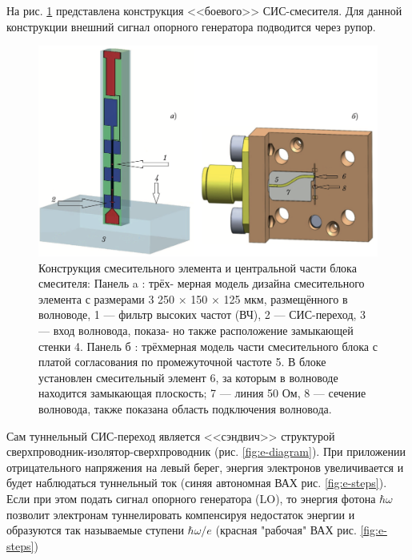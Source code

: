 \documentclass[a4paper]{article}
\begin{document}
На рис. \ref{fig:mixer} представлена конструкция <<боевого>> СИС-смесителя. Для данной конструкции внешний сигнал опорного генератора подводится через рупор.

\begin{figure}[H]
    \centering
    \includegraphics[scale=0.4]{mixer.png}
    \caption{\cite{Rudakov} Конструкция смесительного элемента и центральной части блока смесителя: Панель a : трёх- мерная модель дизайна смесительного элемента с размерами 3 250 × 150 × 125 мкм, размещённого в волноводе, 1 — фильтр высоких частот (ВЧ), 2 — СИС-переход, 3 — вход волновода, показа- но также расположение замыкающей стенки 4. Панель б : трёхмерная модель части смесительного блока с платой согласования по промежуточной частоте 5. В блоке установлен смесительный элемент 6, за которым в волноводе находится замыкающая плоскость; 7 — линия 50 Ом, 8 — сечение волновода, также показана область подключения волновода.}
    \label{fig:mixer}
\end{figure}

Сам туннельный СИС-переход является <<сэндвич>> структурой сверхпроводник-изолятор-сверхпроводник (рис. \ref{fig:e-diagram}). При приложении отрицательного напряжения на левый берег, энергия электронов увеличивается и будет наблюдаться туннельный ток (синяя автономная ВАХ рис. \ref{fig:e-steps}). Если при этом подать сигнал опорного генератора (LO), то энергия фотона $\hbar \omega$ позволит электронам туннелировать компенсируя недостаток энергии и образуются так называемые ступени $\hbar \omega / e$ (красная "рабочая" ВАХ рис. \ref{fig:e-steps})
\end{document}
